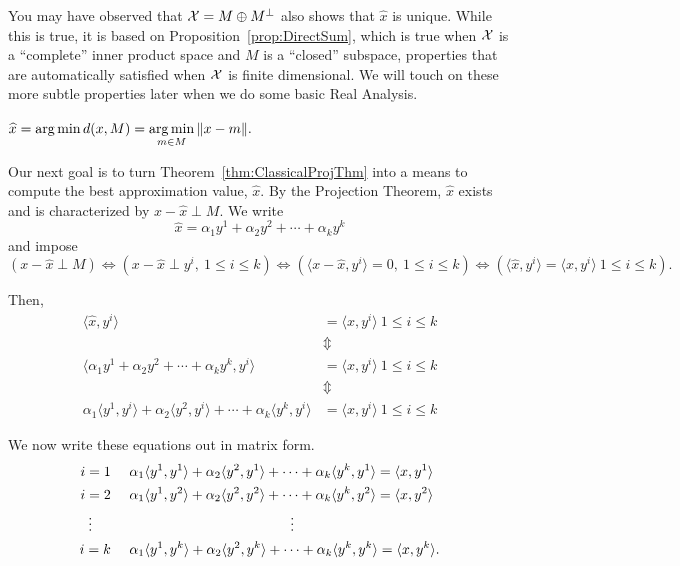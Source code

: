 \begin{rem}
You may have observed that ${\cal X} = M \oplus M^{\perp}$ also shows that $\widehat{x}$ is unique. While this is true, it is based on Proposition~\ref{prop:DirectSum}, which is true when ${\cal X}$ is a ``complete'' inner product space and $M$ is a ``closed'' subspace, properties that are automatically satisfied when ${\cal X}$ is finite dimensional. We will touch on these more subtle properties later when we do some basic Real Analysis.
\end{rem}


\begin{notation}
$\widehat{x} = \operatorname*{arg\,min} d(x,M) = \operatorname*{arg\,min} \limits_{m \in M} \|x - m\|.$
\end{notation}

Our next goal is to turn Theorem~\ref{thm:ClassicalProjThm} into a means to compute the best approximation value, $\widehat{x}$. By the Projection Theorem, $\widehat{x} $ exists and is characterized by $x-\widehat{x} \perp M$. We write
$$\widehat{x}= \alpha_1 y^1+ \alpha_2 y^2+ \cdots +\alpha_k y^k$$
and impose 
$$(x-\widehat{x} \perp M )\iff (x-\widehat{x} \perp y^i,~ 1 \le i \le k) \iff ( \langle x-\widehat{x},y^i \rangle =0,~ 1 \le i \le k) \iff (\langle \widehat{x},y^i \rangle = \langle x,y^i \rangle ~ 1 \le i \le k). $$

Then, 
\begin{align*}
\langle \widehat{x},y^i \rangle &= \langle x,y^i \rangle  ~ 1 \le i \le k \\
& \Updownarrow \\
\langle \alpha_1 y^1+ \alpha_2 y^2+\cdots +\alpha_k y^k, y^i \rangle  & =  \langle x,y^i \rangle ~ 1 \le i \le k  \\
& \Updownarrow \\
\alpha_1  \langle y^1,y^i \rangle +\alpha_2  \langle y^2,y^i \rangle + \cdots + \alpha_k  \langle y^k,y^i \rangle &=  \langle x,y^i \rangle ~ 1 \le i \le k  
\end{align*}

We now write these equations out in matrix form.
\begin{equation}
\label{eq:NormalEquations01}
    \begin{aligned}
    i=1 ~~~~& \alpha_1  \langle y^1,y^1 \rangle +\alpha_2  \langle y^2,y^1 \rangle + \cdots + \alpha_k  \langle y^k,y^1 \rangle =  \langle x,y^1 \rangle \medskip \\
    i=2 ~~~~& \alpha_1  \langle y^1,y^2 \rangle +\alpha_2  \langle y^2,y^2 \rangle + \cdots + \alpha_k  \langle y^k,y^2 \rangle =  \langle x,y^2 \rangle \\
   \vdots ~~~~~~~~ & \hspace{4cm} \vdots \\
    i=k~~~~& \alpha_1  \langle y^1,y^k \rangle +\alpha_2  \langle y^2,y^k \rangle + \cdots + \alpha_k  \langle y^k,y^k \rangle =  \langle x,y^k \rangle.
    \end{aligned}
\end{equation}


